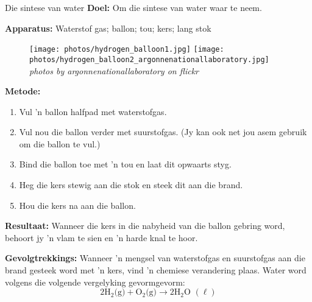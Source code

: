             \begin{g_experiment}{Die sintese van water}
            \nopagebreak
            \label{m38709*id63175}\noindent{}\textbf{Doel:}\newline
    Om die sintese van water waar te neem. \par 
        \label{m38709*id63194}\noindent{}\textbf{Apparatus:}\newline
    Waterstof gas; ballon; tou; kers; lang stok\par 
      \label{m38709*id63199}
    \setcounter{subfigure}{0}
	\begin{figure}[H] %
    \begin{center}
\texttt{[image: photos/hydrogen\_balloon1.jpg]} 
\texttt{[image: photos/hydrogen\_balloon2\_argonnenationallaboratory.jpg]} \\
\textsl{photos by argonnenationallaboratory on flickr}
    \end{center}
 \end{figure}  
        \label{m38709*id63206}\noindent{}\textbf{Metode:}\label{m38709*id63212}\begin{enumerate}[noitemsep, label=\textbf{\arabic*}. ] 
\item Vul 'n ballon halfpad met waterstofgas.
\item Vul nou die ballon verder met suurstofgas. (Jy kan ook net jou asem gebruik om die ballon te vul.)
\item Bind die ballon toe met  'n tou en laat dit opwaarts styg.
\item Heg die kers stewig aan die stok en steek dit aan die brand.
\item Hou die kers na aan die ballon.
\end{enumerate}
        \par 
        \label{m38709*id63254}\noindent{}\textbf{Resultaat:}\newline
Wanneer die kers in die nabyheid van die ballon gebring word, behoort jy 'n vlam te sien en 'n harde knal te hoor.\par 
        \label{m38709*id63302}\noindent{}\textbf{Gevolgtrekkings:}\newline
Wanneer 'n mengsel van waterstofgas en suurstofgas aan die brand gesteek word met 'n kers, vind 'n chemiese verandering plaas. Water word  volgens die volgende vergelyking gevormgevorm:
        \label{m38709*id63313}\nopagebreak\noindent{}
    \begin{equation*}
    2{\text{H}}_{2} \text{(g)} + {\text{O}}_{2}\text{(g)} \to 2\text{H}_{2}\text{O } (\ell)
      \end{equation*}   
\end{g_experiment}

